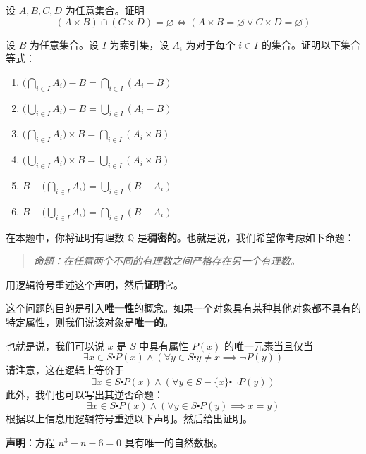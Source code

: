 \begin{exercise}
    设 $A, B, C, D$ 为任意集合。证明
    \[(A \times B) \cap (C \times D) = \varnothing \iff (A \times B = \varnothing \lor C \times D = \varnothing) \]
\end{exercise}

\begin{exercise}
    设 $B$ 为任意集合。设 $I$ 为索引集，设 $A_i$ 为对于每个 $i \in I$ 的集合。证明以下集合等式：

    \begin{enumerate}[label=(\alph*)]
        \item $\displaystyle \Bigg(\bigcap_{i \in I} A_i \Bigg) - B = \bigcap_{i \in I} (A_i - B)$
        \item $\displaystyle \Bigg(\bigcup_{i \in I} A_i \Bigg) - B = \bigcup_{i \in I} (A_i - B)$
        \item $\displaystyle \Bigg(\bigcap_{i \in I} A_i \Bigg) \times B = \bigcap_{i \in I} (A_i \times B)$
        \item $\displaystyle \Bigg(\bigcup_{i \in I} A_i \Bigg) \times B = \bigcup_{i \in I} (A_i \times B)$
        \item $\displaystyle B - \Bigg(\bigcap_{i \in I} A_i \Bigg) = \bigcup_{i \in I} (B - A_i)$
        \item $\displaystyle B - \Bigg(\bigcup_{i \in I} A_i \Bigg) = \bigcap_{i \in I} (B - A_i)$
    \end{enumerate}  
\end{exercise}

\begin{exercise}
    在本题中，你将证明有理数 $\mathbb{Q}$ 是\textbf{稠密的}。也就是说，我们希望你考虑如下命题：

    \begin{quote}
        \emph{命题：在任意两个不同的有理数之间严格存在另一个有理数。}
    \end{quote}
    用逻辑符号重述这个声明，然后\textbf{证明}它。
\end{exercise}

\begin{exercise}
    这个问题的目的是引入\textbf{唯一性}的概念。如果一个对象具有某种其他对象都不具有的特定属性，则我们说该对象是\textbf{唯一的}。

    也就是说，我们可以说 $x$ 是 $S$ 中具有属性 $P(x)$ 的唯一元素当且仅当
    \[\exists x \in S \centerdot P(x) \land (\forall y \in S \centerdot y \ne x \implies \neg P(y))\]
    请注意，这在逻辑上等价于
    \[\exists x \in S \centerdot P(x) \land (\forall y \in S - \{x\} \centerdot \neg P(y))\]
    此外，我们也可以写出其逆否命题：
    \[\exists x \in S \centerdot P(x) \land (\forall y \in S \centerdot P(y) \implies x = y)\]
    根据以上信息用逻辑符号重述以下声明。然后给出证明。

    \textbf{声明}：方程 $n^3 - n - 6 = 0$ 具有唯一的自然数根。
\end{exercise}

